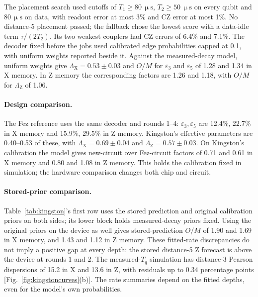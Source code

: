 \documentclass[aps,pra,reprint,nofootinbib,longbibliography,floatfix,showkeys]{revtex4-2}
\newcommand{\eps}{\varepsilon}
\newcommand{\us}{\,\upmu\mathrm{s}}
\newcommand{\LX}{\Lambda_{\mathrm{X}}}
\newcommand{\LZ}{\Lambda_{\mathrm{Z}}}
\begin{document}
The placement search used cutoffs of $T_1\ge80\us$, $T_2\ge50\us$ on every qubit and $80\us$ on data, with readout error at most 3\% and CZ error at most 1\%.
No distance-5 placement passed; the fallback chose the lowest score with a data-idle term $\tau/(2T_2)$.
Its two weakest couplers had CZ errors of 6.4\% and 7.1\%.
The decoder fixed before the jobs used calibrated edge probabilities capped at 0.1, with uniform weights reported beside it.
Against the measured-decay model, uniform weights give $\LX=0.53\pm0.03$ and $O/M$ for $\eps_3$ and $\eps_5$ of 1.28 and 1.34 in X memory.
In Z memory the corresponding factors are 1.26 and 1.18, with $O/M$ for $\LZ$ of 1.06.

\paragraph*{Design comparison.}
The Fez reference uses the same decoder and rounds 1--4: $\eps_3,\eps_5$ are 12.4\%, 22.7\% in X memory and 15.9\%, 29.5\% in Z memory.
Kingston's effective parameters are 0.40--0.53 of these, with $\LX=0.69\pm0.04$ and $\LZ=0.57\pm0.03$.
On Kingston's calibration the model gives new-circuit over Fez-circuit factors of 0.71 and 0.61 in X memory and 0.80 and 1.08 in Z memory.
This holds the calibration fixed in simulation; the hardware comparison changes both chip and circuit.

\paragraph*{Stored-prior comparison.}
Table~\ref{tab:kingston}'s first row uses the stored prediction and original calibration priors on both sides; its lower block holds measured-decay priors fixed.
Using the original priors on the device as well gives stored-prediction $O/M$ of 1.90 and 1.69 in X memory, and 1.43 and 1.12 in Z memory.
These fitted-rate discrepancies do not imply a positive gap at every depth: the stored distance-5 Z forecast is above the device at rounds 1 and 2.
The measured-$T_q$ simulation has distance-3 Pearson dispersions of 15.2 in X and 13.6 in Z, with residuals up to 0.34 percentage points [Fig.~\ref{fig:kingstoncurves}(b)].
The rate summaries depend on the fitted depths, even for the model's own probabilities.
\end{document}
